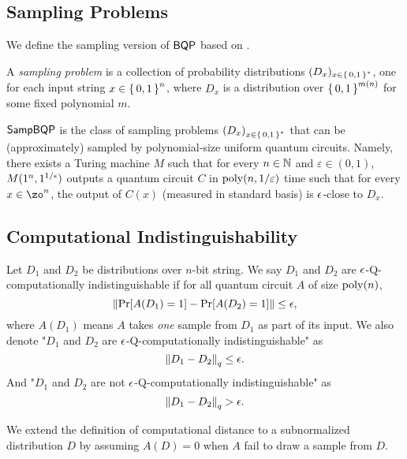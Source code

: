 \subsection{Sampling Problems}

We define the sampling version of $\operatorname{\mathsf{BQP}}$ based on \cite{aaronson_2013}.

\begin{definition} 
	A \emph{sampling problem} is a collection of probability distributions $(D_x)_{x\in\set{0, 1}^*}$, one for each input string $x\in\set{0,1}^n$, where $D_x$ is a distribution over $\set{0,1}^{m(n)}$ for some fixed polynomial $m$.
\end{definition}

\begin{definition} [$\SampBQP$]
	$\SampBQP$ is the class of sampling problems $\left(D_x\right)_{x\in\set{0, 1}^*}$ that can be (approximately) sampled by polynomial-size uniform quantum circuits. Namely, there exists a Turing machine $M$ such that for every $n \in \mathbb{N}$ and $\varepsilon \in (0,1)$, $M(1^n, 1^{1/\epsilon})$ outputs a quantum circuit $C$ in $\operatorname*{\operatorname{poly}}(n, 1/\varepsilon)$ time such that for every $x \in \zo^n$, the output of $C(x)$ (measured in standard basis) is $\epsilon$-close to $D_x$.
\end{definition}


\subsection{Computational Indistinguishability}

\begin{definition}\label{def:comp-indis}
Let  $D_1$ and $D_2$ be distributions over $n$-bit string.  We say $D_1$ and $D_2$  are $\epsilon$-Q-computationally indistinguishable if for all quantum circuit $A$ of size $\operatorname*{\operatorname{poly}}(n)$, $$\left\|\Pr[A({D_1})=1]-\Pr[A({D_2})=1]  \right\| \leq \epsilon,$$  where $A(D_1)$ means $A$ takes \emph{one} sample from $D_1$ as part of its input. We also denote "$D_1$ and $D_2$  are $\epsilon$-Q-computationally indistinguishable" as 
$$ \left\lVert D_1 - D_2\right\rVert_q \leq \epsilon.$$
And "$D_1$ and $D_2$  are not $\epsilon$-Q-computationally indistinguishable" as 
$$ \left\lVert D_1 - D_2\right\rVert_q > \epsilon.$$
\end{definition}

\begin{rmk}
We extend the definition of computational distance to a subnormalized distribution  $D$  by assuming $A(D)=0$ when $A$ fail to draw a sample from $D$.
\end{rmk}

